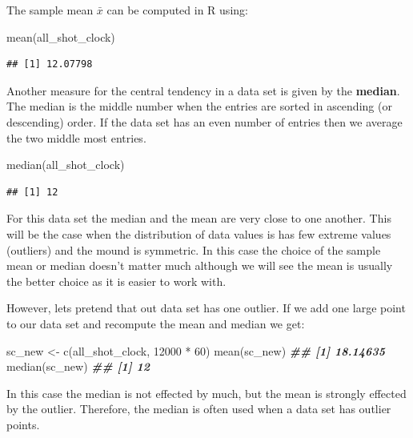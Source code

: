 \documentclass[
]{book}
\newenvironment{Shaded}{\begin{snugshade}}{\end{snugshade}}
\newcommand{\DecValTok}[1]{\textcolor[rgb]{0.00,0.00,0.81}{#1}}
\newcommand{\DocumentationTok}[1]{\textcolor[rgb]{0.56,0.35,0.01}{\textbf{\textit{#1}}}}
\newcommand{\FunctionTok}[1]{\textcolor[rgb]{0.00,0.00,0.00}{#1}}
\newcommand{\NormalTok}[1]{#1}
\newcommand{\OtherTok}[1]{\textcolor[rgb]{0.56,0.35,0.01}{#1}}
\newcommand{\SpecialCharTok}[1]{\textcolor[rgb]{0.00,0.00,0.00}{#1}}
\theoremstyle{definition}
\theoremstyle{definition}
\theoremstyle{definition}
\theoremstyle{definition}
\theoremstyle{remark}
\begin{document}
The sample mean \(\bar{x}\) can be computed in R using:

\begin{Shaded}
\begin{Highlighting}[]
\FunctionTok{mean}\NormalTok{(all\_shot\_clock)}
\end{Highlighting}
\end{Shaded}

\begin{verbatim}
## [1] 12.07798
\end{verbatim}

Another measure for the central tendency in a data set is given by the \textbf{median}. The median is the middle number when the entries are sorted in ascending (or descending) order. If the data set has an even number of entries then we average the two middle most entries.

\begin{Shaded}
\begin{Highlighting}[]
\FunctionTok{median}\NormalTok{(all\_shot\_clock)}
\end{Highlighting}
\end{Shaded}

\begin{verbatim}
## [1] 12
\end{verbatim}

For this data set the median and the mean are very close to one another. This will be the case when the distribution of data values is has few extreme values (outliers) and the mound is symmetric. In this case the choice of the sample mean or median doesn't matter much although we will see the mean is usually the better choice as it is easier to work with.

However, lets pretend that out data set has one outlier. If we add one large point to our data set and recompute the mean and median we get:

\begin{Shaded}
\begin{Highlighting}[]
\NormalTok{sc\_new }\OtherTok{\textless{}{-}} \FunctionTok{c}\NormalTok{(all\_shot\_clock, }\DecValTok{12000} \SpecialCharTok{*} \DecValTok{60}\NormalTok{)}
\FunctionTok{mean}\NormalTok{(sc\_new)}
\DocumentationTok{\#\# [1] 18.14635}
\FunctionTok{median}\NormalTok{(sc\_new)}
\DocumentationTok{\#\# [1] 12}
\end{Highlighting}
\end{Shaded}

In this case the median is not effected by much, but the mean is strongly effected by the outlier. Therefore, the median is often used when a data set has outlier points.
\end{document}
